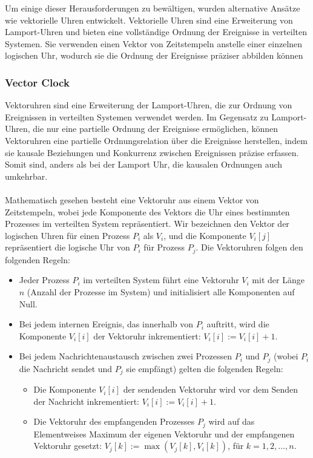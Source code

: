 \documentclass[../vs-script-first-v01.tex]{subfiles}
\begin{document}
Um einige dieser Herausforderungen zu bewältigen, wurden alternative Ansätze wie vektorielle Uhren entwickelt. Vektorielle Uhren sind eine Erweiterung von Lamport-Uhren und bieten eine vollständige Ordnung der Ereignisse in verteilten Systemen. Sie verwenden einen Vektor von Zeitstempeln anstelle einer einzelnen logischen Uhr, wodurch sie die Ordnung der Ereignisse präziser abbilden können

\subsubsection{Vector Clock}
Vektoruhren sind eine Erweiterung der Lamport-Uhren, die zur Ordnung von Ereignissen in verteilten Systemen verwendet werden. Im Gegensatz zu Lamport-Uhren, die nur eine partielle Ordnung der Ereignisse ermöglichen, können Vektoruhren eine partielle Ordnungsrelation  über die Ereignisse herstellen, indem sie kausale Beziehungen und Konkurrenz zwischen Ereignissen präzise erfassen. Somit sind, anders als bei der Lamport Uhr, die kausalen Ordnungen auch umkehrbar.
\\\\
Mathematisch gesehen besteht eine Vektoruhr aus einem Vektor von Zeitstempeln, wobei jede Komponente des Vektors die Uhr eines bestimmten Prozesses im verteilten System repräsentiert. Wir bezeichnen den Vektor der logischen Uhren für einen Prozess $P_i$ als $V_i$, und die Komponente $V_i[j]$ repräsentiert die logische Uhr von $P_i$ für Prozess $P_j$. Die Vektoruhren folgen den folgenden Regeln:
\begin{itemize}
\item Jeder Prozess $P_i$ im verteilten System führt eine Vektoruhr $V_i$ mit der Länge $n$ (Anzahl der Prozesse im System) und initialisiert alle Komponenten auf Null.

\item Bei jedem internen Ereignis, das innerhalb von $P_i$ auftritt, wird die Komponente $V_i[i]$ der Vektoruhr inkrementiert: $V_i[i] := V_i[i] + 1$.

\item Bei jedem Nachrichtenaustausch zwischen zwei Prozessen $P_i$ und $P_j$ (wobei $P_i$ die Nachricht sendet und $P_j$ sie empfängt) gelten die folgenden Regeln:
\begin{itemize}
\item Die Komponente $V_i[i]$ der sendenden Vektoruhr wird vor dem Senden der Nachricht inkrementiert: $V_i[i] := V_i[i] + 1$.
\item Die Vektoruhr des empfangenden Prozesses $P_j$ wird auf das Elementweises Maximum der eigenen Vektoruhr und der empfangenen Vektoruhr gesetzt: $V_j[k] := \max(V_j[k], V_i[k])$, für $k = 1, 2, \dots, n$.
\end{itemize}
\end{itemize}	
\end{document}
